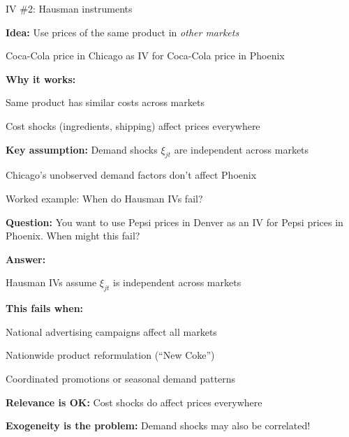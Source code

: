 \documentclass[notes,11pt, aspectratio=169]{beamer}
\newenvironment{wideitemize}{\itemize\addtolength{\itemsep}{10pt}}{\enditemize}
\begin{document}
\begin{frame}{IV \#2: Hausman instruments}
	\begin{wideitemize}
		\item \textbf{Idea:} Use prices of the same product in \textit{other markets}
		\begin{wideitemize}
			\vspace{3pt}
			\item Coca-Cola price in Chicago as IV for Coca-Cola price in Phoenix
		\end{wideitemize} \pause
		\item \textbf{Why it works:}
		\begin{wideitemize}
			\vspace{3pt}
			\item Same product has similar costs across markets
			\item Cost shocks (ingredients, shipping) affect prices everywhere
		\end{wideitemize}
		\item \textbf{Key assumption:} Demand shocks $\xi_{jt}$ are independent across markets
		\begin{wideitemize}
			\vspace{3pt}
			\item Chicago's unobserved demand factors don't affect Phoenix
		\end{wideitemize}
	\end{wideitemize}
\end{frame}

\begin{frame}{Worked example: When do Hausman IVs fail?}
	\begin{wideitemize}
		\item \textbf{Question:} You want to use Pepsi prices in Denver as an IV for Pepsi prices in Phoenix. When might this fail?
		\pause
		\item \textbf{Answer:}
		\item Hausman IVs assume $\xi_{jt}$ is independent across markets
		\item \textbf{This fails when:}
		\begin{wideitemize}
			\vspace{3pt}
			\item National advertising campaigns affect all markets
			\item Nationwide product reformulation (``New Coke'')
			\item Coordinated promotions or seasonal demand patterns
		\end{wideitemize}
		\item \textbf{Relevance is OK:} Cost shocks do affect prices everywhere
		\item \textbf{Exogeneity is the problem:} Demand shocks may also be correlated!
	\end{wideitemize}
\end{frame}
\end{document}
